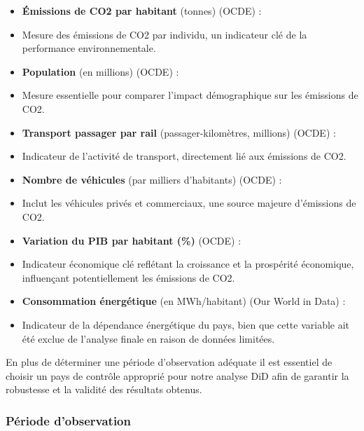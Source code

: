 \begin{itemize}[itemsep=-0.5em]

    \item[] \textbf{Émissions de CO2 par habitant} (tonnes) (OCDE) \supercite{greenhouse}: 
    \item[] Mesure des émissions de CO2 par individu, un indicateur clé de la performance environnementale.

    \item[] \textbf{Population} (en millions) (OCDE) \supercite{oecd_population}: 
    \item[] Mesure essentielle pour comparer l'impact démographique sur les émissions de CO2.
    \item[] \textbf{Transport passager par rail } (passager-kilomètres, millions) (OCDE)\supercite{oecd2023} : 
    \item[] Indicateur de l'activité de transport, directement lié aux émissions de CO2.
    
    \item[] \textbf{Nombre de véhicules } (par milliers d'habitants) (OCDE) \supercite{oecd_transport} : 
    \item[] Inclut les véhicules privés et commerciaux, une source majeure d'émissions de CO2.
    
    \item[] \textbf{Variation du PIB par habitant (\%)} (OCDE) \supercite{gdp} : 
    \item[] Indicateur économique clé reflétant la croissance et la prospérité économique, influençant potentiellement les émissions de CO2.
    
    
    \item[] \textbf{Consommation énergétique} (en MWh/habitant) (Our World in Data) \supercite{energy} : 
    \item[] Indicateur de la dépendance énergétique du pays, bien que cette variable ait été exclue de l'analyse finale en raison de données limitées.
\end{itemize}



En plus de déterminer une période d'observation adéquate il est essentiel de choisir un pays de contrôle approprié pour notre analyse DiD afin de garantir la robustesse et la validité des résultats obtenus.

\subsubsection{Période d'observation}
\label{subsec:observation_period}

